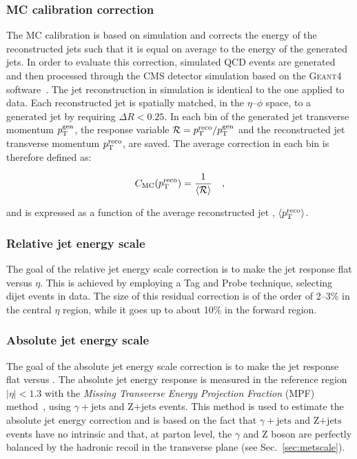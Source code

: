 \subsubsection{MC calibration correction}

The MC calibration is based on simulation and corrects the energy of the reconstructed jets such that it is equal on average to the energy of the generated jets. In order to evaluate this correction, simulated QCD events are generated and then processed through the CMS detector simulation based on the \textsc{Geant4} software~\cite{Agostinelli:2002hh}. The jet reconstruction in simulation is identical to the one applied to data. Each reconstructed jet is spatially matched, in the $\eta$--$\phi$ space, to a generated jet by requiring $\Delta R < 0.25$. In each bin of the generated jet transverse momentum $p_\mathrm{T}^\mathrm{gen}$, the response variable $\mathcal{R}=p_\mathrm{T}^\mathrm{reco}/p_\mathrm{T}^\mathrm{gen}$ and the reconstructed jet transverse momentum $p_\mathrm{T}^\mathrm{reco}$, are saved. The average correction in each bin is therefore defined as:

\begin{equation}
C_\mathrm{MC}(p_\mathrm{T}^\mathrm{reco}) = \frac{1}{\langle \mathcal{R} \rangle} \quad,
\end{equation}

\noindent and is expressed as a function of the average reconstructed jet \pt, $\langle p_\mathrm{T}^\mathrm{reco} \rangle$.

\subsubsection{Relative jet energy scale}

The goal of the relative jet energy scale correction is to make the jet response flat versus $\eta$. This is achieved by employing a Tag and Probe technique, selecting dijet events in data. The size of this residual correction is of the order of 2--3\% in the central $\eta$ region, while it goes up to about 10\% in the forward region.

\subsubsection{Absolute jet energy scale}

The goal of the absolute jet energy scale correction is to make the jet response flat versus \pt. The absolute jet energy response is measured in the reference region $|\eta|<1.3$ with the \emph{Missing Transverse Energy Projection Fraction} (MPF) method~\cite{Abbott:1998xw}, using $\gamma+\mathrm{jets}$ and Z$+\mathrm{jets}$ events. This method is used to estimate the absolute jet energy correction and is based on the fact that $\gamma+\mathrm{jets}$ and Z$+\mathrm{jets}$ events have no intrinsic \MET and that, at parton level, the $\gamma$ and Z boson are perfectly balanced by the hadronic recoil in the transverse plane (see Sec.~\ref{sec:metscale}).


